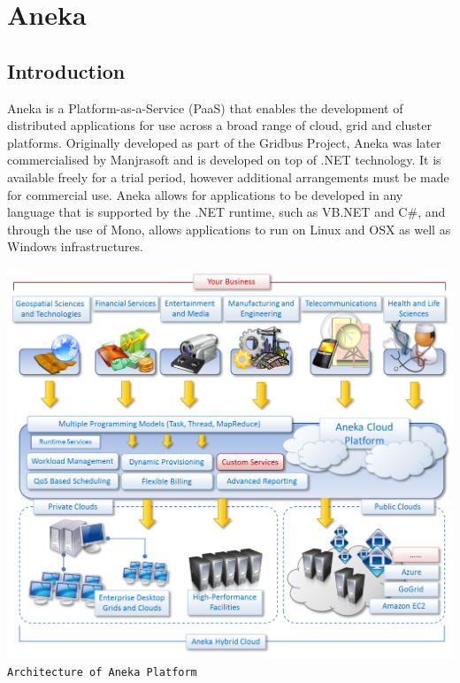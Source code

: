 \chapter{Aneka}
\section{Introduction}
Aneka is a Platform-as-a-Service (PaaS) that enables the development of distributed applications for use across a broad range of cloud, grid and cluster platforms. Originally developed as part of the Gridbus Project, Aneka was later commercialised by Manjrasoft and is developed on top of .NET technology. It is available freely for a trial period\ftAnone, however additional arrangements must be made for commercial use. Aneka allows for applications to be developed in any language that is supported by the .NET runtime, such as VB.NET and C\#, and through the use of Mono, allows applications to run on Linux and OSX as well as Windows infrastructures\cite{Aneka}.
\ftAnoneText

\begin{center}
\includegraphics[scale=0.6]{figs/Aneka.png} \\
\texttt{Architecture of Aneka Platform}\ftAntwo\ftAntwoText
\end{center}


